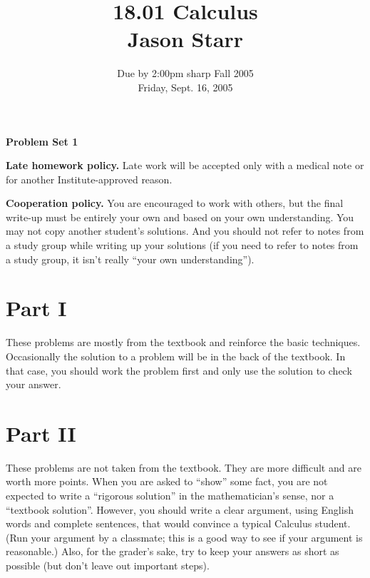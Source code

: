 \documentclass{article}
\begin{document}
\title{18.01 Calculus\\
Jason Starr}
\date{Due by 2:00pm sharp Fall 2005\\
Friday, Sept. 16, 2005}
\maketitle

\textbf{Problem Set 1} 

\noindent \textbf{Late homework policy.} Late work will be accepted only with a medical note or for another Institute-approved reason.

\noindent \textbf{Cooperation policy.} You are encouraged to work with others, but the final write-up must be entirely your own and based on your own understanding. You may not copy another student's solutions. And you should not refer to notes from a study group while writing up your solutions (if you need to refer to notes from a study group, it isn't really “your own understanding”).

\section*{Part I}
These problems are mostly from the textbook and reinforce the basic techniques. Occasionally the solution to a problem will be in the back of the textbook. In that case, you should work the problem first and only use the solution to check your answer.

\section*{Part II}
These problems are not taken from the textbook. They are more difficult and are worth more points. When you are asked to “show” some fact, you are not expected to write a “rigorous solution” in the mathematician's sense, nor a “textbook solution”. However, you should write a clear argument, using English words and complete sentences, that would convince a typical Calculus student. (Run your argument by a classmate; this is a good way to see if your argument is reasonable.) Also, for the grader's sake, try to keep your answers as short as possible (but don't leave out important steps).
\end{document}
